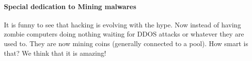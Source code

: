 \paragraph{Special dedication to Mining malwares}
It is funny to see that hacking is evolving with the hype. Now instead of having zombie computers doing nothing waiting for DDOS attacks or whatever they are used to. They are now mining coins (generally connected to a pool). How smart is that? We think that it is amazing!

